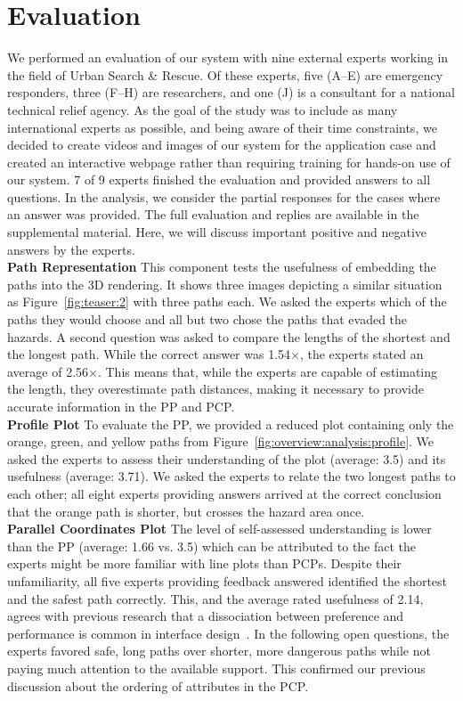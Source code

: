 \documentclass{egpubl}
\begin{document}
\section{Evaluation} \label{sec:evaluation}
We performed an evaluation of our system with nine external experts working in the field of Urban Search \& Rescue. Of these experts, five (A--E) are emergency responders, three (F--H) are researchers, and one (J) is a consultant for a national technical relief agency. As the goal of the study was to include as many international experts as possible, and being aware of their time constraints, we decided to create videos and images of our system for the application case and created an interactive webpage rather than requiring training for hands-on use of our system. 7 of 9 experts finished the evaluation and provided answers to all questions. In the analysis, we consider the partial responses for the cases where an answer was provided. The full evaluation and replies are available in the supplemental material. Here, we will discuss important positive and negative answers by the experts. \\
\textbf{Path Representation} This component tests the usefulness of embedding the paths into the 3D rendering. It shows three images depicting a similar situation as Figure~\ref{fig:teaser:2} with three paths each. We asked the experts which of the paths they would choose and all but two chose the paths that evaded the hazards. A second question was asked to compare the lengths of the shortest and the longest path. While the correct answer was 1.54$\times$, the experts stated an average of 2.56$\times$. This means that, while the experts are capable of estimating the length, they overestimate path distances, making it necessary to provide accurate information in the PP and PCP.\\
\textbf{Profile Plot} To evaluate the PP, we provided a reduced plot containing only the orange, green, and yellow paths from Figure~\ref{fig:overview:analysis:profile}. We asked the experts to assess their understanding of the plot (average: 3.5) and its usefulness (average: 3.71). We asked the experts to relate the two longest paths to each other; all eight experts providing answers arrived at the correct conclusion that the orange path is shorter, but crosses the hazard area once. \\
\textbf{Parallel Coordinates Plot} The level of self-assessed understanding is lower than the PP (average: 1.66 vs. 3.5) which can be attributed to the fact the experts might be more familiar with line plots than PCPs. Despite their unfamiliarity, all five experts providing feedback answered identified the shortest and the safest path correctly. This, and the average rated usefulness of 2.14,  agrees with previous research that a dissociation between preference and performance is common in interface design~\cite{andre1995users}. In the following open questions, the experts favored safe, long paths over shorter, more dangerous paths while not paying much attention to the available support. This confirmed our previous discussion about the ordering of attributes in the PCP.\\
\end{document}
